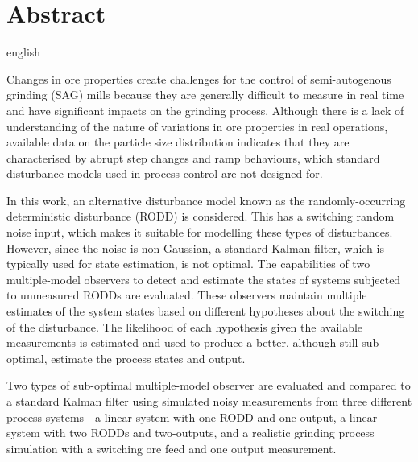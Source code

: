 \chapter*{Abstract}             %
\label{chap-abstract}           %

\begin{otherlanguage*}{english}
  
Changes in ore properties create challenges for the control of semi-autogenous grinding (\acrshort{SAG}) mills because they are generally difficult to measure in real time and have significant impacts on the grinding process. Although there is a lack of understanding of the nature of variations in ore properties in real operations, available data on the particle size distribution indicates that they are characterised by abrupt step changes and ramp behaviours, which standard disturbance models used in process control are not designed for.

In this work, an alternative disturbance model known as the randomly-occurring deterministic disturbance ({\acrshort{RODD}}) is considered. This has a switching random noise input, which makes it suitable for modelling these types of disturbances. However, since the noise is non-Gaussian, a standard Kalman filter, which is typically used for state estimation, is not optimal. The capabilities of two multiple-model observers to detect and estimate the states of systems subjected to unmeasured {\acrshort{RODD}}s are evaluated. These observers maintain multiple estimates of the system states based on different hypotheses about the switching of the disturbance. The likelihood of each hypothesis given the available measurements is estimated and used to produce a better, although still sub-optimal, estimate the process states and output.

Two types of sub-optimal multiple-model observer are evaluated and compared to a standard Kalman filter using simulated noisy measurements from three different process systems---a linear system with one {\acrshort{RODD}} and one output, a linear system with two {\acrshort{RODD}}s and two-outputs, and a realistic grinding process simulation with a switching ore feed and one output measurement.


\end{otherlanguage*}
